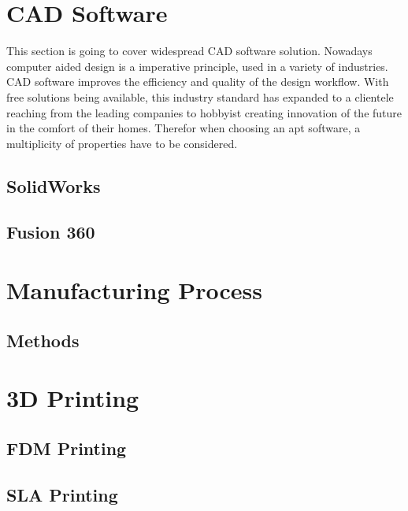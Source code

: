 \section{CAD Software}

This section is going to cover widespread CAD software solution. Nowadays computer aided design is a imperative principle, used in a variety of industries. CAD software improves the efficiency and quality of the design workflow. With free solutions being available, this industry standard has expanded to a clientele reaching from the leading companies to hobbyist creating innovation of the future in the comfort of their homes. Therefor when choosing an apt software, a multiplicity of properties have to be considered.

\subsection{SolidWorks}

\subsection{Fusion 360}

\section{Manufacturing Process}

\subsection{Methods}

\section{3D Printing}

\subsection{FDM Printing}

\subsection{SLA Printing}